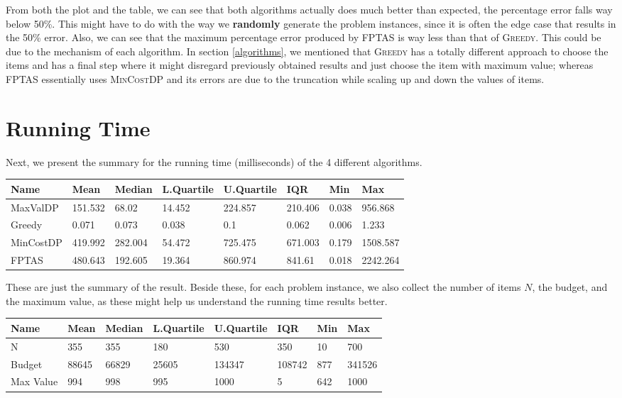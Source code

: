 \documentclass[12pt, oneside]{book}
\begin{document}
From both the plot and the table, we can see that both algorithms
actually does much better than expected, the percentage error falls way
below 50\%. This might have to do with the way we \textbf{randomly}
generate the problem instances, since it is often the edge case that
results in the 50\% error. Also, we can see that the maximum percentage
error produced by \textsc{FPTAS} is way less than that of
\textsc{Greedy}. This could be due to the mechanism of each algorithm.
In section \ref{algorithms}, we mentioned that \textsc{Greedy} has a
totally different approach to choose the items and has a final step
where it might disregard previously obtained results and just choose the
item with maximum value; whereas \textsc{FPTAS} essentially uses
\textsc{MinCostDP} and its errors are due to the truncation while
scaling up and down the values of items.

\section{Running Time}\label{running-time}

Next, we present the summary for the running time (milliseconds) of the
4 different algorithms.

\begin{longtable}[]{@{}llllllll@{}}
\toprule
Name & Mean & Median & L.Quartile & U.Quartile & IQR & Min &
Max\tabularnewline
\midrule
\endhead
MaxValDP & 151.532 & 68.02 & 14.452 & 224.857 & 210.406 & 0.038 &
956.868\tabularnewline
Greedy & 0.071 & 0.073 & 0.038 & 0.1 & 0.062 & 0.006 &
1.233\tabularnewline
MinCostDP & 419.992 & 282.004 & 54.472 & 725.475 & 671.003 & 0.179 &
1508.587\tabularnewline
FPTAS & 480.643 & 192.605 & 19.364 & 860.974 & 841.61 & 0.018 &
2242.264\tabularnewline
\bottomrule
\end{longtable}

These are just the summary of the result. Beside these, for each problem
instance, we also collect the number of items \(N\), the budget, and the
maximum value, as these might help us understand the running time
results better.

\begin{longtable}[]{@{}llllllll@{}}
\toprule
Name & Mean & Median & L.Quartile & U.Quartile & IQR & Min &
Max\tabularnewline
\midrule
\endhead
N & 355 & 355 & 180 & 530 & 350 & 10 & 700\tabularnewline
Budget & 88645 & 66829 & 25605 & 134347 & 108742 & 877 &
341526\tabularnewline
Max Value & 994 & 998 & 995 & 1000 & 5 & 642 & 1000\tabularnewline
\bottomrule
\end{longtable}
\end{document}
